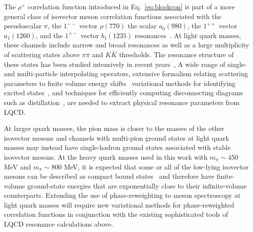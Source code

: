 The $\rho^+$ correlation function introduced in Eq.~\eqref{eq:blockcon} is part of a more general class of isovector meson correlation functions associated with the pseudoscalar $\pi$, the $1^{--}$ vector $\rho(770)$ the scalar $a_0(980)$, the $1^{++}$ vector $a_1(1260)$, and the $1^{+-}$ vector $b_1(1235)$ resonances~\cite{Olive:2016xmw}. 
At light quark masses, these channels include narrow and broad resonances as well as a large multiplicity of scattering states above $\pi \pi$ and $K\bar{K}$ thresholds. 
The resonance structure of these states has been studied intensively in recent years~\cite{Aoki:2007rd,Dudek:2009qf,Dudek:2010wm,Lang:2011mn,Aoki:2011yj,Edwards:2011jj,Thomas:2011rh,Dudek:2011tt,Dudek:2012ag,Dudek:2012gj,Dudek:2012xn,Pelissier:2012pi,Dudek:2013yja,Wilson:2014cna,Bolton:2015psa,Briceno:2015dca,Wilson:2015dqa,Dudek:2016cru,Briceno:2016kkp,Briceno:2016mjc},
A wide range of single- and multi-particle interpolating operators,
extensive formalism relating scattering parameters to finite volume energy shifts~\cite{Luscher:1990ux,Luscher:1990ck,Rummukainen:1995vs,Lellouch:2000pv,Beane:2003da,Feng:2004ua,He:2005ey,Kim:2005gf,Christ:2005gi,Bernard:2008ax,Lage:2009zv,Bernard:2010fp,Luu:2011ep,Briceno:2012yi,Briceno:2012rv,Hansen:2012bj,Hansen:2012tf,Gockeler:2012yj,Dudek:2012xn,Guo:2012hv,Leskovec:2012gb,Briceno:2013bda,Briceno:2013lba,Briceno:2014oea,Hansen:2014eka,Dudek:2014qha,Wilson:2014cna,Wilson:2015dqa,Bali:2015gji,Briceno:2016xwb,Hansen:2017mnd}
variational methods for identifying excited states~\cite{Michael:1985ne,Luscher:1990ck,Dudek:2007wv,Blossier:2009kd},
and techniques for efficiently computing disconnecting diagrams such as distillation~\cite{Peardon:2009gh},
are needed to extract physical resonance parameters from LQCD.

At larger quark masses, the pion mass is closer to the masses of the other isovector mesons
and channels with multi-pion ground states at light quark masses
may instead have single-hadron ground states associated with stable isovector mesons.
At the heavy quark masses used in this work with $m_\pi \sim 450$ MeV and $m_\pi \sim 800$ MeV,
it is expected that some or all of the low-lying isovector mesons can be described as compact bound states~\cite{Briceno:2016xwb}
and therefore have
finite-volume ground-state energies that are exponentially close to their infinite-volume counterparts.
Extending the use of phase-reweighting to meson spectroscopy at light quark masses
will require new variational methods for phase-reweighted correlation functions 
in conjunction with the existing sophisticated tools of LQCD resonance calculations above.

